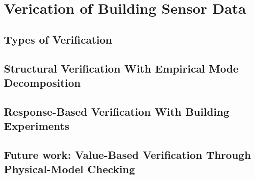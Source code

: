 \chapter{Verication of Building Sensor Data}

\section{Types of Verification}

\section{Structural Verification With Empirical Mode Decomposition}

\section{Response-Based Verification With Building Experiments}

\section{Future work: Value-Based Verification Through Physical-Model Checking}







